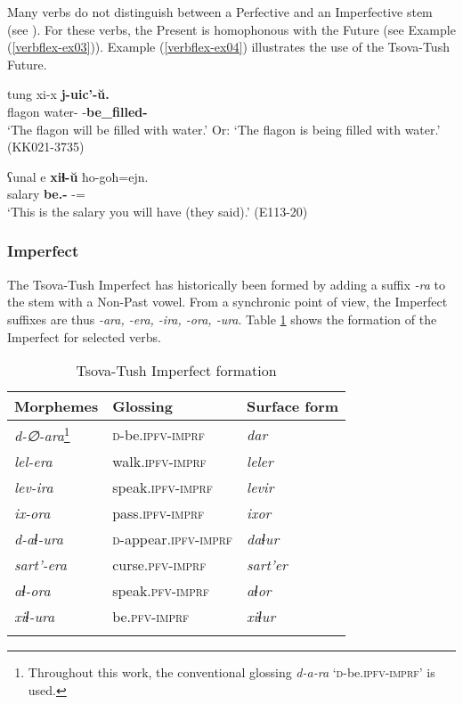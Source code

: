 Many verbs do not distinguish between a Perfective and an Imperfective stem (see ). For these verbs, the Present is homophonous with the Future (see Example (\ref{verbflex-ex03})).  Example (\ref{verbflex-ex04}) illustrates the use of the Tsova-Tush Future.

\begin{exe}
	\ex\label{verbflex-ex03}
	\gll tung xi-x \textbf{j-uic'-\u{u}.}  \\
	flagon water-{\Cont} {\J}-\textbf{be\_filled-{\Npst}} \\
	\trans `The flagon will be filled with water.'  Or:  `The flagon is being filled with water.'
	\hfill (KK021-3735)

	\ex\label{verbflex-ex04}
	\gll ʕunal e \textbf{xiɬ-\u{u}} ħo-goħ=ejn. \\
	salary {\Prox} \textbf{be.{\Pfv}-{\Npst}} {\Ssg}-{\Adess}={\Quot} \\
	\trans `This is the salary you will have (they said).'
	\hfill (E113-20)
\end{exe}

\subsubsection{Imperfect}

The Tsova-Tush Imperfect has historically been formed by adding a suffix \textit{-ra} to the stem with a Non-Past vowel. From a synchronic point of view, the Imperfect suffixes are thus \textit{-ara, -era, -ira, -ora, -ura}. Table \ref{TAME-table3} shows the formation of the Imperfect for selected verbs. 

\begin{table}
	\begin{tabular}{lll}
		\lsptoprule
		Morphemes & {Glossing} & {Surface form} \\\midrule
		
		\textit{d-∅-ara}\footnote{Throughout this work, the conventional glossing \textit{d-a-ra} `\textsc{d}-be.\textsc{ipfv-imprf}' is used.} & \textsc{d}-be.\textsc{ipfv-imprf} & \textit{dar} \\
		\textit{lel-era} & walk.\textsc{ipfv-imprf} & \textit{leler} \\
		\textit{lev-ira} & speak.\textsc{ipfv-imprf} & \textit{levir} \\
		\textit{ix-ora} & pass.\textsc{ipfv-imprf} & \textit{ixor} \\
		\textit{d-aɬ-ura} & \textsc{d}-appear.\textsc{ipfv-imprf} & \textit{daɬur} \\\midrule
		\textit{sart'-era} & curse.\textsc{pfv-imprf} & \textit{sart'er} \\
		\textit{aɬ-ora} & speak.\textsc{pfv-imprf} & \textit{aɬor} \\
		\textit{xiɬ-ura} & be.\textsc{pfv-imprf} & \textit{xiɬur} \\
		\lspbottomrule
	\end{tabular}
	\caption{Tsova-Tush Imperfect formation}
	\label{TAME-table3}
\end{table}


